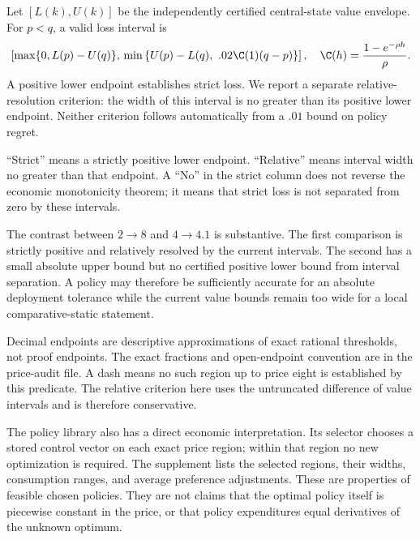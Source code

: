 Let $[L(k),U(k)]$ be the independently certified central-state value envelope. For $p<q$, a valid loss interval is
\begin{equation}
 \left[\max\{0,L(p)-U(q)\},\\
 \min\left\{U(p)-L(q),\ .02\C(1)(q-p)\right\}\right],
 \quad \C(h)=\frac{1-e^{-\rho h}}{\rho}.
 \label{eq:welfare}
\end{equation}
A positive lower endpoint establishes strict loss. We report a separate relative-resolution criterion: the width of this interval is no greater than its positive lower endpoint. Neither criterion follows automatically from a $.01$ bound on policy regret.

\begin{table}[t]\centering\small
\caption{Certified welfare losses when the adjustment price rises}\label{tab:welfare}

\par\smallskip\footnotesize ``Strict'' means a strictly positive lower endpoint. ``Relative'' means interval width no greater than that endpoint. A ``No'' in the strict column does not reverse the economic monotonicity theorem; it means that strict loss is not separated from zero by these intervals.
\end{table}

The contrast between $2\to8$ and $4\to4.1$ is substantive. The first comparison is strictly positive and relatively resolved by the current intervals. The second has a small absolute upper bound but no certified positive lower bound from interval separation. A policy may therefore be sufficiently accurate for an absolute deployment tolerance while the current value bounds remain too wide for a local comparative-static statement.

\begin{table}[t]\centering\small
\caption{Price regions in which welfare losses are separated}\label{tab:regions}

\par\smallskip\footnotesize Decimal endpoints are descriptive approximations of exact rational thresholds, not proof endpoints. The exact fractions and open-endpoint convention are in the price-audit file. A dash means no such region up to price eight is established by this predicate. The relative criterion here uses the untruncated difference of value intervals and is therefore conservative.
\end{table}

The policy library also has a direct economic interpretation. Its selector chooses a stored control vector on each exact price region; within that region no new optimization is required. The supplement lists the selected regions, their widths, consumption ranges, and average preference adjustments. These are properties of feasible chosen policies. They are not claims that the optimal policy itself is piecewise constant in the price, or that policy expenditures equal derivatives of the unknown optimum.

